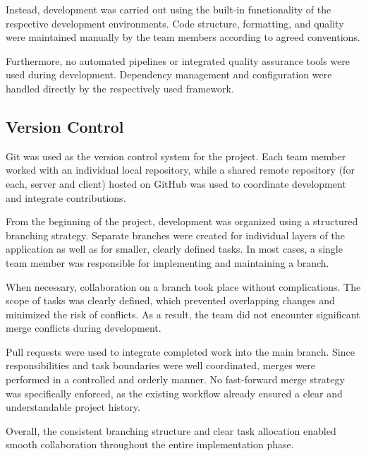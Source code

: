 Instead, development was carried out using the built-in functionality of the respective development environments. Code structure, formatting, and quality were maintained manually by the team members according to agreed conventions.

Furthermore, no automated pipelines or integrated quality assurance tools were used during development. Dependency management and configuration were handled directly by the respectively used framework.

\subsection{Version Control}
\label{subsubsec:version-control}

Git was used as the version control system for the project. Each team member worked with an individual local repository, while a shared remote repository (for each, server and client) hosted on GitHub was used to coordinate development and integrate contributions.

From the beginning of the project, development was organized using a structured branching strategy. Separate branches were created for individual layers of the application as well as for smaller, clearly defined tasks. In most cases, a single team member was responsible for implementing and maintaining a branch.

When necessary, collaboration on a branch took place without complications. The scope of tasks was clearly defined, which prevented overlapping changes and minimized the risk of conflicts. As a result, the team did not encounter significant merge conflicts during development.

Pull requests were used to integrate completed work into the main branch. Since responsibilities and task boundaries were well coordinated, merges were performed in a controlled and orderly manner. No fast-forward merge strategy was specifically enforced, as the existing workflow already ensured a clear and understandable project history.

Overall, the consistent branching structure and clear task allocation enabled smooth collaboration throughout the entire implementation phase.